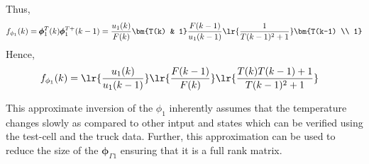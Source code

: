 Thus,
\begin{align*}
        f_{\phi_1}(k) &= \pmb\phi_1^T(k) \pmb \phi_1^{T+}(k-1)
                      = \frac{u_1(k)}{F(k)} \bm{T(k) & 1} \frac{F(k-1)}{u_1(k-1)}
                      \lr{\frac{1}{T(k-1)^2 + 1}} \bm{T(k-1) \\ 1}\\
\end{align*}
Hence,
\begin{align}
        f_{\phi_1}(k) &= \lr{\frac{u_1(k)}{u_1(k-1)}} \lr{\frac{F(k-1)}{F(k)}} \lr{\frac{T(k)T(k-1) + 1}{T(k-1)^2 + 1}}
\end{align}


 This approximate inversion of the $\phi_1$ inherently assumes that the temperature changes slowly as compared to other intput and states which can be verified using the test-cell and the truck data. Further, this approximation can be used to reduce the size of the $\pmb \phi_{\Gamma1}$ ensuring that it is a full rank matrix.

